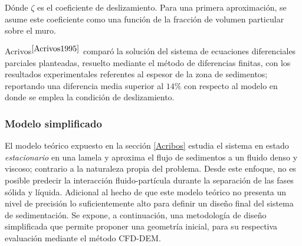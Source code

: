 \noindent
\justify

D\'onde $\zeta$ es el coeficiente de deslizamiento. Para una primera aproximaci\'on, se asume este coeficiente como una funci\'on de la fracci\'on de volumen particular sobre el muro.

\noindent
\justify

Acrivos$^{\cite{Acrivos1995}}$ compar\'o la soluci\'on del sistema de ecuaciones diferenciales parciales planteadas, resuelto mediante el m\'etodo de diferencias finitas, con los resultados experimentales referentes al espesor de la zona de sedimentos; reportando una diferencia media superior al $14 \%$ con respecto al modelo en donde se emplea la condici\'on de deslizamiento.

\subsubsection{Modelo simplificado} \label{simplificado}

\noindent
\justify

El modelo te\'orico expuesto en la secci\'on \ref{Acribos} estudia el sistema en estado \textit{estacionario} en una lamela y aproxima el flujo de sedimentos a un fluido denso y viscoso; contrario a la naturaleza propia del problema. Desde este enfoque, no es posible predecir la interacci\'on fluido-part\'icula durante la separaci\'on de las fases s\'olida y l\'iquida. Adicional al hecho de que este modelo te\'orico no presenta un nivel de precisi\'on lo suficientemente alto para definir un dise\~no final del sistema de sedimentaci\'on. Se expone, a continuaci\'on, una metodolog\'ia de dise\~no simplificada que permite proponer una geometr\'ia inicial, para su respectiva evaluaci\'on mediante el m\'etodo CFD-DEM.








